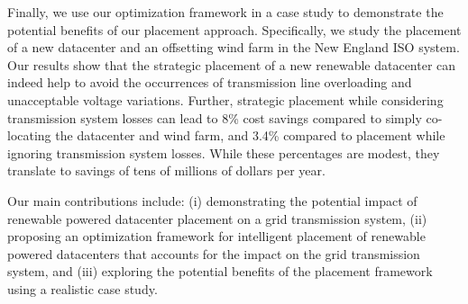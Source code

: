 Finally, we use our optimization framework in a case study to
demonstrate the potential benefits of our placement approach.
Specifically, we study the placement of a new datacenter and an
offsetting wind farm in the New England ISO system.  Our results show
that the strategic placement of a new renewable datacenter can indeed
help to avoid the occurrences of transmission line overloading and
unacceptable voltage variations.  Further, strategic placement while
considering transmission system losses can lead to 8\% cost savings
compared to simply co-locating the datacenter and wind farm, and 3.4\%
compared to placement while ignoring transmission system losses.
While these percentages are modest, they translate to savings of tens
of millions of dollars per year.


 Our main contributions include: (i) demonstrating the potential impact of renewable powered datacenter placement on a grid transmission system, (ii) proposing an optimization framework for intelligent placement of renewable powered datacenters that accounts for the impact on the grid transmission system, and (iii) exploring the potential benefits of the placement framework using a realistic case study.

